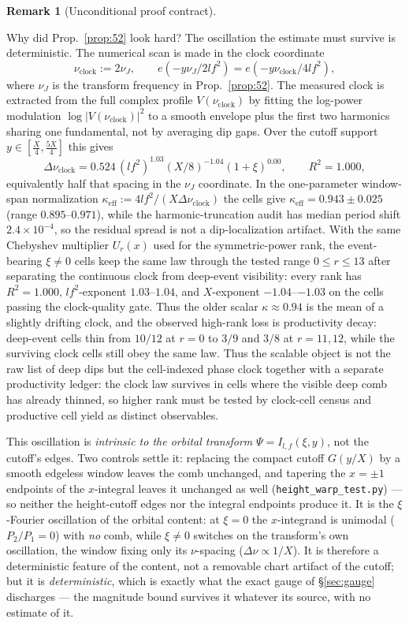 \documentclass[11pt]{article}
\theoremstyle{definition}
\newtheorem{remark}[theorem]{Remark}
\begin{document}
\begin{remark}[Unconditional proof contract]
\begin{enumerate}
Why did Prop.~\ref{prop:52} look hard? The oscillation the estimate must survive is deterministic.
The numerical scan is made in the clock coordinate
\[
  \nu_{\mathrm{clock}}:=2\nu_J,\qquad
  e(-y\nu_J/2lf^2)=e(-y\nu_{\mathrm{clock}}/4lf^2),
\]
where $\nu_J$ is the transform frequency in Prop.~\ref{prop:52}. The measured clock is extracted from the
full complex profile $V(\nu_{\mathrm{clock}})$ by fitting the log-power modulation
$\log |V(\nu_{\mathrm{clock}})|^2$ to a smooth envelope plus the first two harmonics sharing one
fundamental, not by averaging dip gaps. Over the cutoff support $y\in[\tfrac X4,\tfrac{5X}4]$ this gives
\[
  \Delta\nu_{\mathrm{clock}}
   =0.524\,(lf^2)^{1.03}(X/8)^{-1.04}(1+\xi)^{0.00},\qquad R^2=1.000,
\]
equivalently half that spacing in the $\nu_J$ coordinate. In the one-parameter window-span normalization
$\kappa_{\mathrm{eff}}:=4lf^2/(X\Delta\nu_{\mathrm{clock}})$ the cells give
$\kappa_{\mathrm{eff}}=0.943\pm0.025$ (range $0.895$--$0.971$), while the harmonic-truncation audit has
median period shift $2.4\times10^{-4}$, so the residual spread is not a dip-localization artifact. With the
same Chebyshev multiplier $U_r(x)$ used for the symmetric-power rank, the event-bearing $\xi\ne0$ cells keep
the same law through the tested range $0\le r\le13$ after separating the continuous clock from deep-event
visibility: every rank has $R^2=1.000$, $lf^2$-exponent $1.03$--$1.04$, and $X$-exponent
$-1.04$--$-1.03$ on the cells passing the clock-quality gate. Thus the older scalar
$\kappa\approx0.94$ is the mean of a slightly drifting clock, and the observed high-rank loss is productivity
decay: deep-event cells thin from $10/12$ at $r=0$ to $3/9$ and $3/8$ at $r=11,12$, while the surviving
clock cells still obey the same law. Thus the scalable object is not the raw list of deep dips but the
cell-indexed phase clock together with a separate productivity ledger: the clock law survives in cells where
the visible deep comb has already thinned, so higher rank must be tested by clock-cell census and productive
cell yield as distinct observables.

This oscillation is \emph{intrinsic to the orbital transform} $\Psi=I_{l,f}(\xi,y)$, not the cutoff's edges.
Two controls settle it: replacing the compact cutoff $G(y/X)$ by a smooth edgeless window leaves the comb
unchanged, and tapering the $x=\pm1$ endpoints of the $x$-integral leaves it unchanged as well
(\texttt{height\_warp\_test.py}) --- so neither the height-cutoff edges nor the integral endpoints produce it.
It is the $\xi$-Fourier oscillation of the orbital content: at $\xi=0$ the $x$-integrand is unimodal
($P_2/P_1=0$) with \emph{no} comb, while $\xi\neq0$ switches on the transform's own oscillation, the window
fixing only its $\nu$-spacing ($\Delta\nu\propto1/X$). It is therefore a deterministic feature of the content,
not a removable chart artifact of the cutoff; but it is \emph{deterministic}, which is exactly what the exact
gauge of \S\ref{sec:gauge} discharges --- the magnitude bound survives it whatever its source, with no estimate
of it.


\end{enumerate}
\end{remark}
\end{document}
